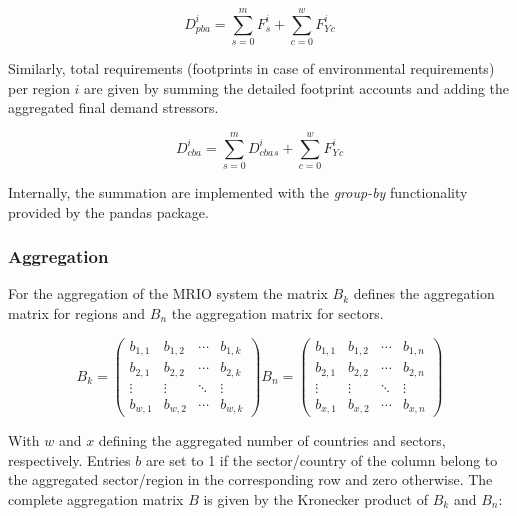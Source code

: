 \documentclass{jors}
\begin{document}
{\begin{equation}
    D_{pba}^i = \sum_{s=0}^m F^i_s + \sum_{c=0}^w F_Y^i_c
\end{equation}

Similarly, total requirements (footprints in case of environmental requirements) per region $i$ are given by summing the detailed footprint accounts and adding the aggregated final demand stressors.

\begin{equation}
    D_{cba}^i = \sum_{s=0}^m D_{cba}^i_s + \sum_{c=0}^w F_Y^i_c
\end{equation}

Internally, the summation are implemented with the \textit{group-by} functionality provided by the pandas package.


\subsubsection*{Aggregation}

For the aggregation of the MRIO system the matrix $B_k$ defines
the aggregation matrix for regions and $B_n$ the aggregation matrix
for sectors.

\begin{equation}
    B_k =
    \begin{pmatrix}
      b_{1,1} & b_{1,2} & \cdots & b_{1,k} \\
      b_{2,1} & b_{2,2} & \cdots & b_{2,k} \\
      \vdots  & \vdots  & \ddots & \vdots  \\
      b_{w,1} & b_{w,2} & \cdots & b_{w,k}
    \end{pmatrix}
    B_n =
    \begin{pmatrix}
      b_{1,1} & b_{1,2} & \cdots & b_{1,n} \\
      b_{2,1} & b_{2,2} & \cdots & b_{2,n} \\
      \vdots  & \vdots  & \ddots & \vdots  \\
      b_{x,1} & b_{x,2} & \cdots & b_{x,n}
    \end{pmatrix}
\end{equation}

With $w$ and $x$ defining the aggregated number of countries and sectors,
respectively. Entries $b$ are set to 1 if the sector/country of the column
belong to the aggregated sector/region in the corresponding row and zero
otherwise. The complete aggregation matrix $B$ is given by the Kronecker
product of $B_k$ and $B_n$:

}
\end{document}
